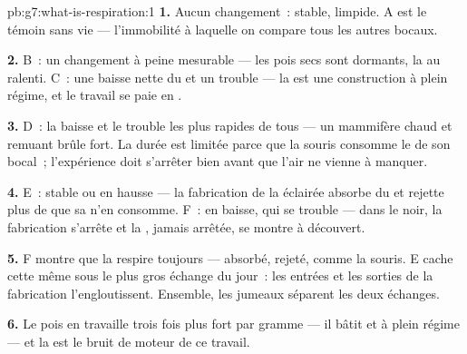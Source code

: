 \begin{solution}{pb:g7:what-is-respiration:1}
\textbf{1.} Aucun changement~:  stable, 
limpide. A est le témoin sans vie --- l'immobilité à laquelle on
compare tous les autres bocaux.

\textbf{2.} B~: un changement à peine mesurable --- les pois secs
sont dormants, la  au ralenti. C~: une baisse nette du
 et un trouble --- la  est une construction à
plein régime, et le travail se paie en .

\textbf{3.} D~: la baisse et le trouble les plus rapides de tous ---
un mammifère chaud et remuant brûle fort. La durée est limitée parce
que la souris consomme le  de son bocal~; l'expérience doit
s'arrêter bien avant que l'air ne vienne à manquer.

\textbf{4.} E~:  stable ou en hausse --- la fabrication de
la  éclairée absorbe du  et rejette plus de
 que sa  n'en consomme. F~:  en baisse,
 qui se trouble --- dans le noir, la fabrication
s'arrête et la , jamais arrêtée, se montre à découvert.

\textbf{5.} F montre que la  respire toujours --- 
absorbé,  rejeté, comme la souris. E cache cette
même  sous le plus gros échange du jour~: les entrées et
les sorties de la fabrication l'engloutissent. Ensemble, les jumeaux
séparent les deux échanges.

\textbf{6.} Le pois en  travaille trois fois plus fort
par gramme --- il bâtit  et  à plein régime --- et la
 est le bruit de moteur de ce travail.


\end{solution}
